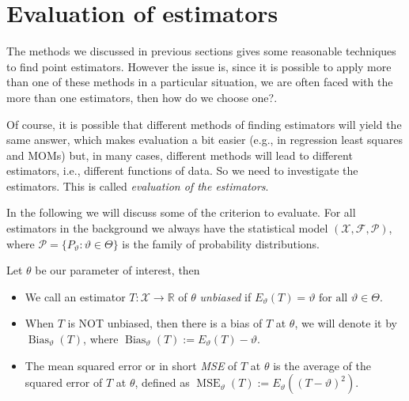 \documentclass[ 11pt,%
				a4paper,%
				twoside,%
				headinclude,%
				footinclude = true,%
				cleardoublepage = empty,%
				reqno]{scrbook}
\begin{document}

\section{Evaluation of estimators}
The methods we discussed in previous sections gives some reasonable techniques to find point estimators. However the issue is, since it is possible to apply more than one of these methods in a particular situation, we are often faced with the more than one estimators, then how do we choose one?. 

Of course, it is possible that different methods of finding estimators will yield the same answer, which makes evaluation a bit easier (e.g., in regression least squares and MOMs) but, in many cases, different methods will lead to different estimators, i.e., different functions of data. So we need to investigate the estimators. This is called \emph{evaluation of the estimators}. 

In the following we will discuss some of the criterion to evaluate. For all estimators in the background we always have the statistical model $\left(\mathcal{X}, \mathscr{F}, \mathcal{P}\right)$, where $\mathcal{P} = \{P_{\vartheta}: \vartheta \in \Theta\}$ is the family of probability distributions. 




\begin{definition}
Let $\theta$ be our parameter of interest, then 

\begin{itemize}[itemsep = 3pt]
  \item We call an estimator $T: \mathcal{X} \rightarrow \mathbb{R}$ of $\theta$ \emph{unbiased} if $E_{\vartheta}(T)=\vartheta \text { for all } \vartheta \in \Theta$.

\item When $T$ is NOT unbiased, then there is a bias of $T$ at $\theta$, we will denote it by $\operatorname{Bias}_{\vartheta}(T)$, where $\operatorname{Bias}_{\vartheta}(T) := E_{\vartheta}(T)-\vartheta$.

\item The mean squared error or in short \emph{MSE} of $T$ at $\theta$ is the average of the squared error of $T$ at $\theta$, defined as ${\operatorname{MSE}_{\vartheta}(T):=E_{\vartheta}\left(\left(T-\vartheta\right)^{2}\right)}$. 
\end{itemize}

\end{definition}
\end{document}
